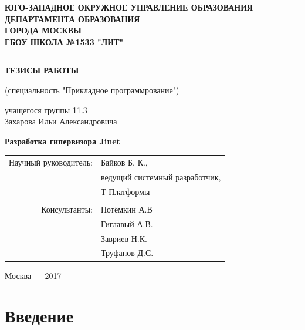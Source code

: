 \documentclass[a4paper,12pt]{extarticle}
\begin{document}
	{
		\begin{titlepage}
			\centering
			\textbf{\uppercase{ЮГО-ЗАПАДНОЕ ОКРУЖНОЕ УПРАВЛЕНИЕ ОБРАЗОВАНИЯ\\ДЕПАРТАМЕНТА ОБРАЗОВАНИЯ\\ГОРОДА МОСКВЫ\\\vspace{0.5cm}ГБОУ ШКОЛА №1533 "ЛИТ"}}\par
			\rule{\textwidth}{1pt}\par
			\vspace{2.25cm}
			\large\textbf{ТЕЗИСЫ РАБОТЫ}\par
			\vspace{0.5cm}
			\large(специальность "Прикладное программрование")\par
			\vspace{0.5cm}
			\large{учащегося группы 11.3\\Захарова Ильи Александровича}\par
			\vspace{2cm}
			{\Huge{\textbf{Разработка гипервизора Jinet}}}\par
			\vspace{3cm}
			\begin{flushright}
				\begin{tabular}{rl}
					Научный руководитель:& Байков Б. К.,\\
					& ведущий системный разработчик,\\
					& \flqq Т-Платформы\frqq\\
					& \\
					Консультанты:& Потёмкин А.В\\
					& Гиглавый А.В.\\
					& Завриев Н.К.\\
					& Труфанов Д.С.
					
				\end{tabular}
			\end{flushright}
			\par
			\vfill
			Москва --- 2017
		\end{titlepage}
	}
	\linespread{1.2}
	\tableofcontents
	\linespread{1.2}
	\pagebreak
	\section{Введение}
	
\end{document}
